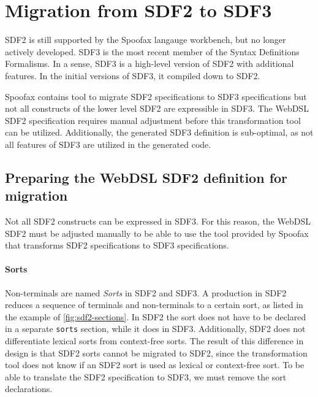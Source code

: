   \section{\label{sec:sdf2-to-sdf3}Migration from SDF2 to SDF3}

    SDF2 is still supported by the Spoofax langauge workbench, but no longer actively developed. SDF3 is the most recent member of the Syntax Definitions Formalisms. In a sense, SDF3 is a high-level version of SDF2 with additional features. In the initial versions of SDF3, it compiled down to SDF2.

    Spoofax contains tool to migrate SDF2 specifications to SDF3 specifications but not all constructs of the lower level SDF2 are expressible in SDF3. The WebDSL SDF2 specification requires manual adjustment before this transformation tool can be utilized. Additionally, the generated SDF3 definition is sub-optimal, as not all features of SDF3 are utilized in the generated code.

    \subsection{\label{subsec:preparing-webdsl-sdf2}Preparing the WebDSL SDF2 definition for migration}

      Not all SDF2 constructs can be expressed in SDF3. For this reason, the WebDSL SDF2 must be adjusted manually to be able to use the tool provided by Spoofax that transforms SDF2 specifications to SDF3 specifications.

      \paragraph{Sorts} Non-terminals are named \textit{Sorts} in SDF2 and SDF3. A production in SDF2 reduces a sequence of terminals and non-terminals to a certain sort, as listed in the example of \cref{fig:sdf2-sections}. In SDF2 the sort does not have to be declared in a separate \texttt{sorts} section, while it does in SDF3. Additionally, SDF2 does not differentiate lexical sorts from context-free sorts. The result of this difference in design is that SDF2 sorts cannot be migrated to SDF2, since the transformation tool does not know if an SDF2 sort is used as lexical or context-free sort. To be able to translate the SDF2 specification to SDF3, we must remove the sort declarations.

